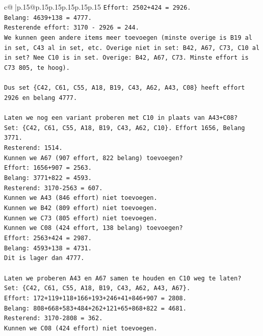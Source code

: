 \documentclass{article}
\begin{document}
{\begin{supertabular}{c@{$\;$}|p{.15\linewidth}@{}p{.15\linewidth}p{.15\linewidth}p{.15\linewidth}p{.15\linewidth}p{.15\linewidth}}
{{{\texttt{Effort: 2502+424 = 2926.} \\
\texttt{Belang: 4639+138 = 4777.} \\
\texttt{Resterende effort: 3170 {-} 2926 = 244.} \\
\texttt{We kunnen geen andere items meer toevoegen (minste overige is B19 al in set, C43 al in set, etc. Overige niet in set: B42, A67, C73, C10 al in set? Nee C10 is in set. Overige: B42, A67, C73. Minste effort is C73 805, te hoog).} \\
\\ 
\texttt{Dus set \{C42, C61, C55, A18, B19, C43, A62, A43, C08\} heeft effort 2926 en belang 4777.} \\
\\ 
\texttt{Laten we nog een variant proberen met C10 in plaats van A43+C08?} \\
\texttt{Set: \{C42, C61, C55, A18, B19, C43, A62, C10\}. Effort 1656, Belang 3771.} \\
\texttt{Resterend: 1514.} \\
\texttt{Kunnen we A67 (907 effort, 822 belang) toevoegen?} \\
\texttt{Effort: 1656+907 = 2563.} \\
\texttt{Belang: 3771+822 = 4593.} \\
\texttt{Resterend: 3170{-}2563 = 607.} \\
\texttt{Kunnen we A43 (846 effort) niet toevoegen.} \\
\texttt{Kunnen we B42 (809 effort) niet toevoegen.} \\
\texttt{Kunnen we C73 (805 effort) niet toevoegen.} \\
\texttt{Kunnen we C08 (424 effort, 138 belang) toevoegen?} \\
\texttt{Effort: 2563+424 = 2987.} \\
\texttt{Belang: 4593+138 = 4731.} \\
\texttt{Dit is lager dan 4777.} \\
\\ 
\texttt{Laten we proberen A43 en A67 samen te houden en C10 weg te laten?} \\
\texttt{Set: \{C42, C61, C55, A18, B19, C43, A62, A43, A67\}.} \\
\texttt{Effort: 172+119+118+166+193+246+41+846+907 = 2808.} \\
\texttt{Belang: 808+668+583+484+262+121+65+868+822 = 4681.} \\
\texttt{Resterend: 3170{-}2808 = 362.} \\
\texttt{Kunnen we C08 (424 effort) niet toevoegen.} \\
}}}
\end{supertabular}}
\end{document}
